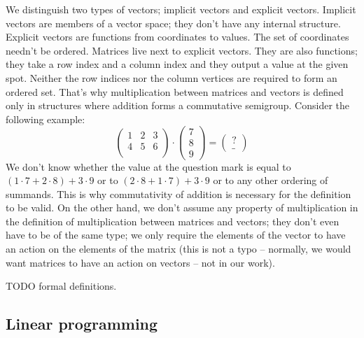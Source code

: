 \documentclass[]{article}
\renewcommand{\.}{\hskip .75pt}
\let\*=\cdot
\begin{document}
We distinguish two types of vectors; implicit vectors and explicit vectors.
Implicit vectors are members of a vector space; they don't have any internal structure.
Explicit vectors are functions from coordinates to values.
The set of coordinates needn't be ordered.
Matrices live next to explicit vectors. They are also functions; they take a row index
and a column index and they output a value at the given spot.
Neither the row indices nor the column vertices are required to form an ordered set.
That's why multiplication between matrices and vectors is defined only in structures
where addition forms a commutative semigroup. Consider the following example:
$$
\begin{pmatrix}
	1 & 2 & 3 \\
	4 & 5 & 6 \\
\end{pmatrix}
\*
\begin{pmatrix}
	7 \\ 8 \\ 9
\end{pmatrix}
=
\begin{pmatrix}
	? \\ \_
\end{pmatrix}
$$
We don't know whether the value at the question mark is equal to
$ (1 \* 7 + 2 \* 8) + 3 \* 9 $ or to
$ (2 \* 8 + 1 \* 7) + 3 \* 9 $ or to
any other ordering of summands.
This is why commutativity of addition is necessary for the definition to be valid.
On the other hand, we don't assume any property of multiplication in the
definition of multiplication between matrices and vectors; they don't even
have to be of the same type; we only require the elements of the vector
to have an action on the elements of the matrix (this is not a typo -- normally,
we would want matrices to have an action on vectors -- not in our work).

TODO formal definitions.

\subsection{Linear programming}
\end{document}
